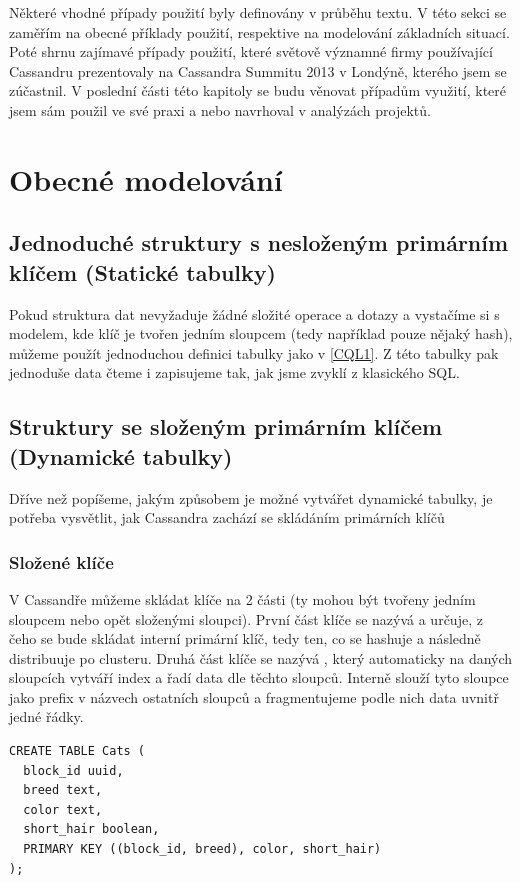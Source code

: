 Některé vhodné případy použití byly definovány v průběhu textu. V této sekci se zaměřím na obecné příklady použití, respektive na modelování základních situací. Poté shrnu zajímavé případy použití, které světově významné firmy používající Cassandru prezentovaly na Cassandra Summitu 2013 v Londýně, kterého jsem se zúčastnil. V poslední části této kapitoly se budu věnovat případům využití, které jsem sám použil ve své praxi a nebo navrhoval v analýzách projektů. 

\section{Obecné modelování}

\subsection{Jednoduché struktury s nesloženým primárním klíčem (Statické tabulky)}

Pokud struktura dat nevyžaduje žádné složité operace a dotazy a vystačíme si s modelem, kde klíč je tvořen jedním sloupcem (tedy například pouze nějaký hash), můžeme použít jednoduchou definici tabulky jako v \ref{CQL1}. Z této tabulky pak jednoduše data čteme i zapisujeme tak, jak jsme zvyklí z klasického SQL.

\subsection{Struktury se složeným primárním klíčem (Dynamické tabulky)}

Dříve než popíšeme, jakým způsobem je možné vytvářet dynamické tabulky, je potřeba vysvětlit, jak Cassandra zachází se skládáním primárních klíčů

\subsubsection*{Složené klíče}
V Cassandře můžeme skládat klíče na 2 části (ty mohou být tvořeny jedním sloupcem nebo opět složenými sloupci). První část klíče se nazývá  a určuje, z čeho se bude skládat interní primární klíč, tedy ten, co se hashuje a následně distribuuje po clusteru. Druhá část klíče se nazývá , který automaticky na daných sloupcích vytváří index a řadí data dle těchto sloupců. Interně slouží tyto sloupce jako prefix v názvech ostatních sloupců a fragmentujeme podle nich data uvnitř jedné řádky. 

\begin{lstlisting}[caption={Ukázka složených klíčů},label=CQL2]
CREATE TABLE Cats (
  block_id uuid,
  breed text,
  color text,
  short_hair boolean,
  PRIMARY KEY ((block_id, breed), color, short_hair)
);
\end{lstlisting}

